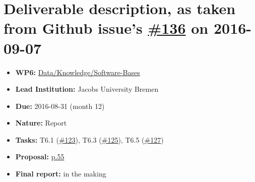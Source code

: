 \section*{\texorpdfstring{Deliverable description, as taken from Github
issue's
\href{https://github.com/OpenDreamKit/OpenDreamKit/issues/136}{\#136} on
2016-09-07}{Deliverable description, as taken from Github issue's \#136 on 2016-09-07}}\label{deliverable-description-as-taken-from-github-issues-136-on-2016-09-07}

\begin{itemize}
\tightlist
\item
  \textbf{WP6:}
  \href{https://github.com/OpenDreamKit/OpenDreamKit/tree/master/WP6}{Data/Knowledge/Software-Bases}
\item
  \textbf{Lead Institution:} Jacobs University Bremen
\item
  \textbf{Due:} 2016-08-31 (month 12)
\item
  \textbf{Nature:} Report
\item
  \textbf{Tasks:} T6.1
  (\href{https://github.com/OpenDreamKit/OpenDreamKit/issues/123}{\#123}),
  T6.3
  (\href{https://github.com/OpenDreamKit/OpenDreamKit/issues/125}{\#125}),
  T6.5
  (\href{https://github.com/OpenDreamKit/OpenDreamKit/issues/127}{\#127})
\item
  \textbf{Proposal:}
  \href{https://github.com/OpenDreamKit/OpenDreamKit/raw/master/Proposal/proposal-www.pdf}{p.55}
\item
  \textbf{Final report:} in the making
\end{itemize}
